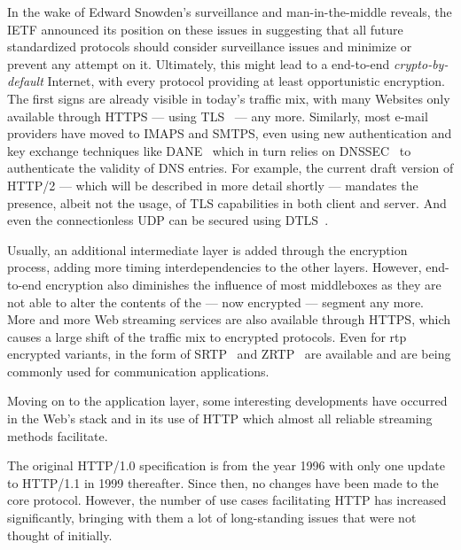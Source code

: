 In the wake of Edward Snowden's surveillance and man-in-the-middle reveals, the \gls{IETF} announced its position on these issues in \cite{rfc6973} suggesting that all future standardized protocols should consider surveillance issues and minimize or prevent any attempt on it. Ultimately, this might lead to a end-to-end \textit{crypto-by-default} Internet, with every protocol providing at least opportunistic encryption. The first signs are already visible in today's traffic mix, with many Websites only available through \acrshort{HTTPS} --- using \gls{TLS}~\cite{rfc5246} --- any more. Similarly, most e-mail providers have moved to \acrshort{IMAPS} and \acrshort{SMTPS}, even using new authentication and key exchange techniques like \gls{DANE}~\cite{rfc6698} which in turn relies on \gls{DNSSEC}~\cite{rfc4033} to authenticate the validity of \gls{DNS} entries. For example, the current draft version of \gls{HTTP}/2 --- which will be described in more detail shortly --- mandates the presence, albeit not the usage, of \gls{TLS} capabilities in both client and server. And even the connectionless \gls{UDP} can be secured using \gls{DTLS}~\cite{rfc6347}.

Usually, an additional intermediate layer is added through the encryption process, adding more timing interdependencies to the other layers. However, end-to-end encryption also diminishes the influence of most middleboxes as they are not able to alter the contents of the --- now encrypted --- segment any more. More and more Web streaming services are also available through \gls{HTTPS}, which causes a large shift of the traffic mix to encrypted protocols. Even for \gls{rtp} encrypted variants, in the form of SRTP~\cite{rfc3711} and ZRTP~\cite{rfc6189} are available and are being commonly used for communication applications.

Moving on to the application layer, some interesting developments have occurred in the Web's stack and in its use of \gls{HTTP} which almost all reliable streaming methods facilitate.

The original HTTP/1.0 specification is from the year 1996 with only one update to HTTP/1.1 in 1999 thereafter. Since then, no changes have been made to the core protocol. However, the number of use cases facilitating \gls{HTTP} has increased significantly, bringing with them a lot of long-standing issues that were not thought of initially.


